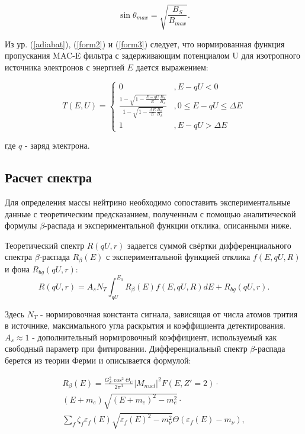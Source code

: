 \documentclass[a4paper,14pt]{extarticle}
\begin{document}
    \begin{equation}
        \label{form3}
        \sin \theta_{max} = \sqrt{\frac{B_S}{B_{max}}}.
    \end{equation}
    
    Из ур. (\ref{adiabat}), (\ref{form2}) и (\ref{form3}) следует, что нормированная функция пропускания MAC-E
    фильтра с задерживающим потенциалом U для изотропного источника электронов с энергией $E$ дается выражением:
    
    \begin{equation}
      T(E,U) = 
      \begin{cases} 
        0 & , E - qU < 0 \\
        \frac{1 - \sqrt{1-\frac{E-qU}{E} \frac{B_{S}}{B_{A}}}}{1 - \sqrt{1-\frac{\Delta E}{E}\frac{B_{S}}{B_{A}}}} & , 0 \leq E-qU \leq \Delta E \\
        1 & , E - qU > \Delta E
      \end{cases}
    \end{equation}
    
    \noindent где $q$ - заряд электрона.
    
    
    
    \subsection{Расчет спектра}
    Для определения массы нейтрино необходимо сопоставить экспериментальные данные
    с теоретическим предсказанием, полученным с помощью аналитической формулы $\beta$-распада
    и экспериментальной функции отклика, описанными ниже.
    
    Теоретический спектр $R(qU,r)$ задается суммой свёртки дифференциального спектра $\beta$-распада $R_{\beta}(E)$ 
    с экспериментальной функцией отклика $f(E,qU,R)$ и фона $R_{bg}(qU,r)$:
    \begin{equation}
      R(qU,r)=A_s N_T \int_{qU}^{E_0} R_{\beta}(E)f(E,qU,R)dE + R_{bg}(qU,r).
    \end{equation}
    
    Здесь $N_T$ - нормировочная константа сигнала, зависящая от числа атомов трития в источнике, максимального угла
    раскрытия и коэффициента детектирования. $A_s \approx 1$ - дополнительный нормировочный коэффициент, используемый
    как свободный параметр при фитировании. Дифференциальный спектр $\beta$-распада берется из теории Ферми и описывается
    формулой:
    
    \begin{multline}
        R_{\beta}(E) = \frac{G_F^2 \cos^2 \Theta_C}{2 \pi^3} |M_{nucl}|^2 F(E, Z'=2) \cdot \\
        (E + m_e) \sqrt{(E+m_e)^2-m_e^2} \cdot \\
        \displaystyle\sum_f \zeta_f \varepsilon_f(E) \sqrt{\varepsilon_f(E)^2-m_{\nu}^2} \Theta(\varepsilon_f(E)-m_{\nu}),
    \end{multline}
    
\end{document}
